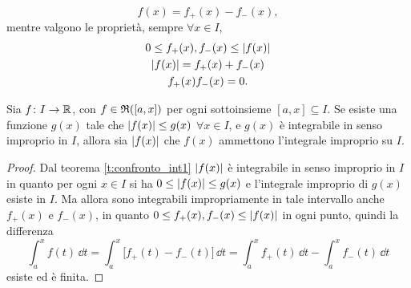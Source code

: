 \[
f(x)=f_+(x)-f_-(x),
\]
mentre valgono le proprietà, sempre $\forall x\in I$,
\[\begin{gathered}
0\leq f_+(x),f_-(x)\leq\lvert f(x)\rvert\\
\lvert f(x)\rvert=f_+(x)+f_-(x)\\
f_+(x)f_-(x)=0.
\end{gathered}\]
\begin{teorema} \label{t:confronto_int2}
Sia $f\colon I\to\mathbb{R}$, con $f\in\mathfrak{R}([a,x])$ per ogni sottoinsieme $[a,x]\subseteq I$.
Se esiste una funzione $g(x)$ tale che $\lvert f(x)\rvert\leq g(x)$ $\forall x\in I$, e $g(x)$ è integrabile in senso improprio in $I$, allora sia $\lvert f(x)\rvert$ che $f(x)$ ammettono l'integrale improprio su $I$.
\end{teorema}
\begin{proof}
Dal teorema \ref{t:confronto_int1} $\lvert f(x)\rvert$ è integrabile in senso improprio in $I$ in quanto per ogni $x\in I$ si ha $0\leq\lvert f(x)\rvert\leq g(x)$ e l'integrale improprio di $g(x)$ esiste in $I$.
Ma allora sono integrabili impropriamente in tale intervallo anche $f_+(x)$ e $f_-(x)$, in quanto $0\leq f_+(x),f_-(x)\leq\lvert f(x)\rvert$ in ogni punto, quindi la differenza
\[
\int_a^xf(t)\,\dd t=\int_a^x\big[f_+(t)-f_-(t)\big]\,\dd t=\int_a^xf_+(t)\,\dd t-\int_a^xf_-(t)\,\dd t
\]
esiste ed è finita.
\end{proof}

